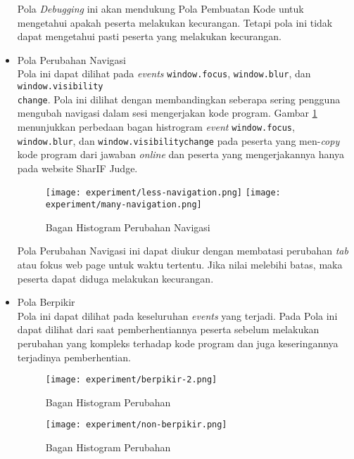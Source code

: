 \begin{itemize}
    Pola \textit{Debugging} ini akan mendukung Pola Pembuatan Kode untuk mengetahui apakah peserta melakukan kecurangan. Tetapi pola ini tidak dapat mengetahui pasti peserta yang melakukan kecurangan.

    \item Pola Perubahan Navigasi \\
    Pola ini dapat dilihat pada \textit{events} \verb|window.focus|, \verb|window.blur|, dan \verb|window.visibility|\\\verb|change|. Pola ini dilihat dengan membandingkan seberapa sering pengguna mengubah navigasi dalam sesi mengerjakan kode program. 
    Gambar \ref{fig:5:2:3:navigation} menunjukkan perbedaan bagan histrogram \textit{event} \verb|window.focus|, \verb|window.blur|, dan \verb|window.visibilitychange| pada peserta yang men-\textit{copy} kode program dari jawaban \textit{online} dan peserta yang mengerjakannya hanya pada website SharIF Judge.  

    \begin{figure}[H]
        \centering
        \texttt{[image: experiment/less-navigation.png]}
        \texttt{[image: experiment/many-navigation.png]}
        \caption{Bagan Histogram Perubahan Navigasi}
        \label{fig:5:2:3:navigation}
    \end{figure}

    Pola Perubahan Navigasi ini dapat diukur dengan membatasi perubahan \textit{tab} atau fokus web page untuk waktu tertentu. Jika nilai melebihi batas, maka peserta dapat diduga melakukan kecurangan.

    \item Pola Berpikir \\
    Pola ini dapat dilihat pada keseluruhan \textit{events} yang terjadi. Pada Pola ini dapat dilihat dari saat pemberhentiannya peserta sebelum melakukan perubahan yang kompleks terhadap kode program dan juga keseringannya terjadinya pemberhentian.
    
    \begin{figure}[H]
        \centering
        \texttt{[image: experiment/berpikir-2.png]}
        \caption{Bagan Histogram Perubahan}
        \label{fig:5:2:3:berpikir}
    \end{figure}

    \begin{figure}[H]
        \centering
        \texttt{[image: experiment/non-berpikir.png]}
        \caption{Bagan Histogram Perubahan}
        \label{fig:5:2:3:tidakberpikir}
    \end{figure}


\end{itemize}
